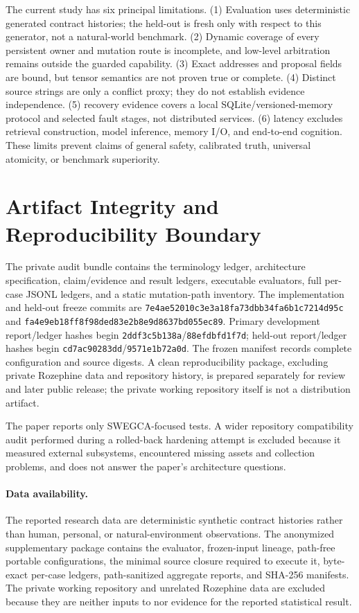 \documentclass[10pt]{article}
\newcommand{\swegca}{\textsc{SWEGCA}}
\newcommand{\code}[1]{\texttt{#1}}
\begin{document}
The current study has six principal limitations. (1) Evaluation uses deterministic generated contract histories; the held-out is fresh only with respect to this generator, not a natural-world benchmark. (2) Dynamic coverage of every persistent owner and mutation route is incomplete, and low-level arbitration remains outside the guarded capability. (3) Exact addresses and proposal fields are bound, but tensor semantics are not proven true or complete. (4) Distinct source strings are only a conflict proxy; they do not establish evidence independence. (5) recovery evidence covers a local SQLite/versioned-memory protocol and selected fault stages, not distributed services. (6) latency excludes retrieval construction, model inference, memory I/O, and end-to-end cognition. These limits prevent claims of general safety, calibrated truth, universal atomicity, or benchmark superiority.

\section{Artifact Integrity and Reproducibility Boundary}

The private audit bundle contains the terminology ledger, architecture specification, claim/evidence and result ledgers, executable evaluators, full per-case JSONL ledgers, and a static mutation-path inventory. The implementation and held-out freeze commits are \texttt{7e4ae52010c3e3a18fa7\allowbreak{}3dbb34fa6b1c7214d95c} and \texttt{fa4e9eb18ff8f98ded83\allowbreak{}e2b8e9d8637bd055ec89}. Primary development report/ledger hashes begin \code{2ddf3c5b138a}/\code{88efdbfd1f7d}; held-out report/ledger hashes begin \code{cd7ac90283dd}/\code{9571e1b72a0d}. The frozen manifest records complete configuration and source digests. A clean reproducibility package, excluding private Rozephine data and repository history, is prepared separately for review and later public release; the private working repository itself is not a distribution artifact.

The paper reports only \swegca-focused tests. A wider repository compatibility audit performed during a rolled-back hardening attempt is excluded because it measured external subsystems, encountered missing assets and collection problems, and does not answer the paper's architecture questions.

\paragraph{Data availability.}
The reported research data are deterministic synthetic contract histories rather than human, personal, or natural-environment observations. The anonymized supplementary package contains the evaluator, frozen-input lineage, path-free portable configurations, the minimal source closure required to execute it, byte-exact per-case ledgers, path-sanitized aggregate reports, and SHA-256 manifests. The private working repository and unrelated Rozephine data are excluded because they are neither inputs to nor evidence for the reported statistical result.
\end{document}
